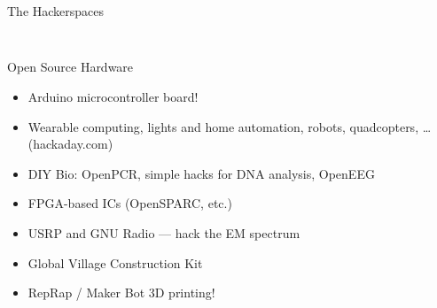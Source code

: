 \documentclass{beamer}
\begin{document}
\subsection{}
\begin{frame}{The Hackerspaces}
\begin{columns}
\begin{column}{7cm}
\end{column}
\end{columns}
\end{frame}

\subsection{}
\begin{frame}{Open Source Hardware}
\begin{itemize}
\item Arduino microcontroller board!
\item Wearable computing, lights and home automation, robots, quadcopters, \dots (hackaday.com)
\item DIY Bio: OpenPCR, simple hacks for DNA analysis, OpenEEG
\item FPGA-based ICs (OpenSPARC, etc.)
\item USRP and GNU Radio --- hack the EM spectrum
\item Global Village Construction Kit
\item RepRap / Maker Bot 3D printing!
\end{itemize}
\end{frame}
\end{document}
